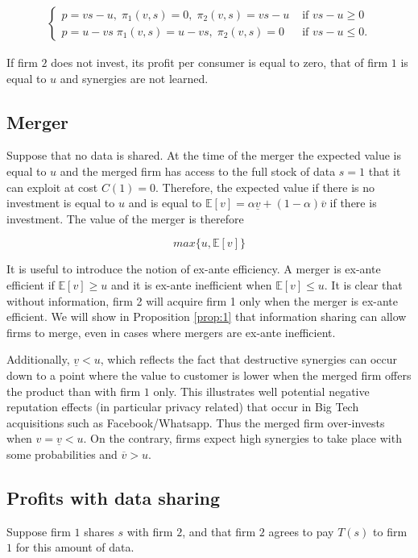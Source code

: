 \documentclass[a4paper,leqno]{article}%
\newcommand{\E}{\mathbb E}
\renewcommand{\a}{\alpha}
\newcommand{\uv}{\underline{v}}
\newcommand{\ov}{\overline{v}}
\begin{document}
\begin{align}\label{comp}
\begin{cases}
    p=vs-u,\; \pi_1(v,s)=0,\; \pi_2(v,s)=vs-u & \text{ if }vs-u\geq 0\\ 
    p=u-vs\; \pi_1(v,s)=u-vs,\; \pi_2(v,s)=0 & \text{ if }vs-u\leq 0.
\end{cases}
\end{align}

If firm $2$ does not invest, its profit per consumer is equal to zero, that of firm $1$ is equal to $u$ and synergies are not learned.


\subsection{Merger}
%
Suppose that no data is shared. At the time of the merger the expected value is equal to $u$ and the merged firm has access to the full stock of data $s=1$ that it can exploit at cost $C(1)=0$. Therefore, the expected value if there is no investment is equal to $u$ and is equal to $\E[v]=\a \uv+(1-\a)\ov$ if there is investment. The value of the merger is therefore
%

$$max\{u,\E[v]\}$$
%

It is useful to introduce the notion of ex-ante efficiency. A merger is ex-ante efficient if $\E[v]\geq u$ and it is ex-ante inefficient when $\E[v]\leq u$. It is clear that without information, firm 2 will acquire firm 1 only when the merger is ex-ante efficient. We will show in Proposition \ref{prop:1} that information sharing can allow firms to merge, even in cases where mergers are ex-ante inefficient. 


%

Additionally, $\uv<u$, which reflects the fact that destructive synergies can occur down to a point where the value to customer is lower when the merged firm offers the product than with firm $1$ only. This illustrates well potential negative reputation effects (in particular privacy related) that occur in Big Tech acquisitions such as Facebook/Whatsapp. Thus the merged firm over-invests when $v=\uv<u$. On the contrary, firms expect high synergies to take place with some probabilities and $\ov>u$.

\subsection{Profits with data sharing}

Suppose firm $1$ shares $s$ with firm $2$, and that firm $2$ agrees to pay $T(s)$ to firm $1$ for this amount of data. 
\end{document}
